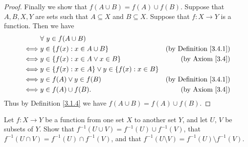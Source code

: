\begin{proof}
    Finally we show that \(f(A \cup B) = f(A) \cup f(B)\).
    Suppose that \(A, B, X, Y\) are sets such that \(A \subseteq X\) and \(B \subseteq X\).
    Suppose that \(f : X \to Y\) is a function.
    Then we have
    \begin{align*}
             & \forall\ y \in f(A \cup B)                                                                  \\
        \iff & y \in \{f(x) : x \in A \cup B\}                        & \text{(by Definition \ref{3.4.1})} \\
        \iff & y \in \{f(x) : x \in A \lor x \in B\}                  & \text{(by Axiom \ref{3.4})}        \\
        \iff & y \in \{f(x) : x \in A\} \lor y \in \{f(x) : x \in B\}                                      \\
        \iff & y \in f(A) \lor y \in f(B)                             & \text{(by Definition \ref{3.4.1})} \\
        \iff & y \in f(A) \cup f(B).                                  & \text{(by Axiom \ref{3.4})}
    \end{align*}
    Thus by Definition \ref{3.1.4} we have \(f(A \cup B) = f(A) \cup f(B)\).
\end{proof}

\begin{exercise}\label{ex 3.4.4}
    Let \(f : X \to Y\) be a function from one set \(X\) to another set \(Y\), and let \(U\), \(V\) be subsets of \(Y\). Show that \(f^{-1}(U \cup V) = f^{-1}(U) \cup f^{-1}(V)\), that
    \(f^{-1}(U \cap V) = f^{-1}(U) \cap f^{-1}(V)\), and that \(f^{-1}(U \setminus V) = f^{-1}(U) \setminus f^{-1}(V)\).
\end{exercise}


